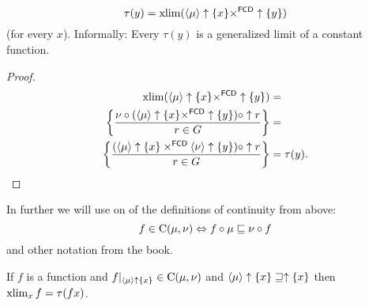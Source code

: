 \begin{prop}
\[ \tau(y)=\operatorname{xlim}(\left\langle \mu\right\rangle\uparrow\{x\}\times^{\mathsf{FCD}}\uparrow\{y\}) \]
(for every $x$). Informally: Every $\tau(y)$ is a generalized limit
of a constant function.
\end{prop}

\begin{proof}
~
\begin{align*}
\operatorname{xlim}(\left\langle \mu\right\rangle\uparrow\{x\}\times^{\mathsf{FCD}}\uparrow\{y\}) & =\\
\left\{ \frac{\nu\circ(\left\langle \mu\right\rangle\uparrow\{x\}\times^{\mathsf{FCD}}\uparrow\{y\})\circ\uparrow r}{r\in G}\right\} & =\\
\left\{ \frac{(\left\langle \mu\right\rangle\uparrow\{x\}\times^{\mathsf{FCD}}\left\langle \nu\right\rangle\uparrow\{y\})\circ\uparrow r}{r\in G}\right\} & =\tau(y).
\end{align*}
\end{proof}

In further we will use on of the definitions of continuity from above:
\[ f\in\mathrm{C}(\mu,\nu)\Leftrightarrow
f\circ\mu \sqsubseteq \nu\circ f \]
and other notation from the book.

\begin{thm}
If $f$ is a function and $f|_{\left\langle \mu\right\rangle\uparrow\{x\}}\in\mathrm{C}(\mu,\nu)$
and $\left\langle \mu\right\rangle\uparrow\{x\}\sqsupseteq\uparrow\{x\}$
then $\operatorname{xlim}_{x}f=\tau(fx)$.\end{thm}

